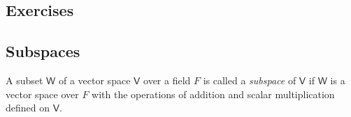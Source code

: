 \subsection{Exercises}
\begin{exercise}
     
\end{exercise}

\subsection{Subspaces}
A subset $\mathsf{W}$ of a vector space $\mathsf{V}$ over a field $F$ is called a
\emph{subspace} of $\mathsf{V}$ if $\mathsf{W}$ is a vector space over $F$ with
the operations of addition and scalar multiplication defined on $\mathsf{V}$.